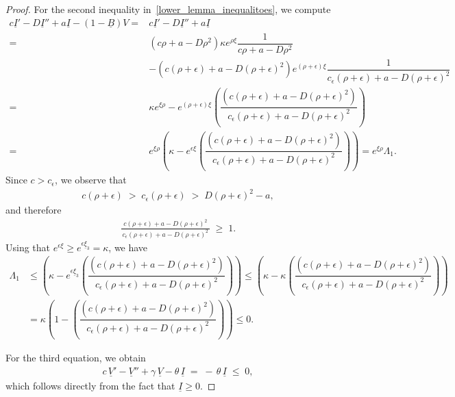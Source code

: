 \documentclass[11pt]{article}
\theoremstyle{definition}
\begin{document}
\begin{proof}
For the second inequality in~\eqref{lower_lemma_inequalitoes}, we compute
{
\begin{align}\label{lower_equationI_V_and B_zero}
  \nonumber  c \underline{I}'-D \underline{I}'' + a\underline{I}-(1-\underline{B})V=& c \underline{I}'-D \underline{I}'' + a\underline{I} \\ =& (c \rho+a-D \rho^2)\kappa e^{\rho \xi} \dfrac{1}{c \rho +a - D \rho^2} \\ &-(c (\rho+\epsilon)+a-D (\rho+\epsilon)^2)e^{(\rho+ \epsilon)\xi}\dfrac{1}{c_\epsilon (\rho+\epsilon) +a - D (\rho+\epsilon)^2}\\ \nonumber =& \kappa e^{\xi \rho}- e^{(\rho+\epsilon)\xi}\left(\dfrac{(c(\rho+\epsilon)+a-D (\rho+\epsilon)^2)}{c_\epsilon (\rho+\epsilon) +a - D (\rho+\epsilon)^2}\right)\\=& e^{\xi \rho }\left( \kappa- e^{\epsilon\xi} \left(\dfrac{(c(\rho+\epsilon)+a-D (\rho+\epsilon)^2)}{c_\epsilon (\rho+\epsilon) +a - D (\rho+\epsilon)^2}\right) \right)=e^{\xi \rho} \Lambda_1.
\end{align}
Since $c > c_{\epsilon}$, we observe that
\begin{align}
    c(\rho+\epsilon)
    \;>\;
    c_{\epsilon}(\rho+\epsilon)
    \;>\;
    D(\rho+\epsilon)^{2} - a,
\end{align}
and therefore
\begin{align}
    \frac{c(\rho+\epsilon) + a - D(\rho+\epsilon)^{2}}
         {\,c_{\epsilon}(\rho+\epsilon) + a - D(\rho+\epsilon)^{2}\,}
    \;\ge\; 1.
\end{align}
Using that $e^{\epsilon\xi}\ge e^{\epsilon \underline{\xi}_3}=\kappa$, we have  
\begin{align}
    \Lambda_1 &\le \left( \kappa- e^{\epsilon \underline{\xi}_3} \left(\dfrac{(c(\rho+\epsilon)+a-D (\rho+\epsilon)^2)}{c_\epsilon (\rho+\epsilon) +a - D (\rho+\epsilon)^2}\right) \right)  \le \left( \kappa- \kappa \left(\dfrac{(c(\rho+\epsilon)+a-D (\rho+\epsilon)^2)}{c_\epsilon (\rho+\epsilon) +a - D (\rho+\epsilon)^2}\right) \right) \\ & = \kappa \left( 1-  \left(\dfrac{(c(\rho+\epsilon)+a-D (\rho+\epsilon)^2)}{c_\epsilon (\rho+\epsilon) +a - D (\rho+\epsilon)^2}\right) \right)\le 0.
\end{align}
}

For the third equation, we obtain
\begin{align}
    c\,\underline{V}' - \underline{V}'' + \gamma\,\underline{V} - \theta\,\underline{I}
    \;=\;
    -\,\theta\,\underline{I}
    \;\le\; 0,
\end{align}
which follows directly from the fact that $\underline{I} \ge 0$.


\end{proof}
\end{document}
